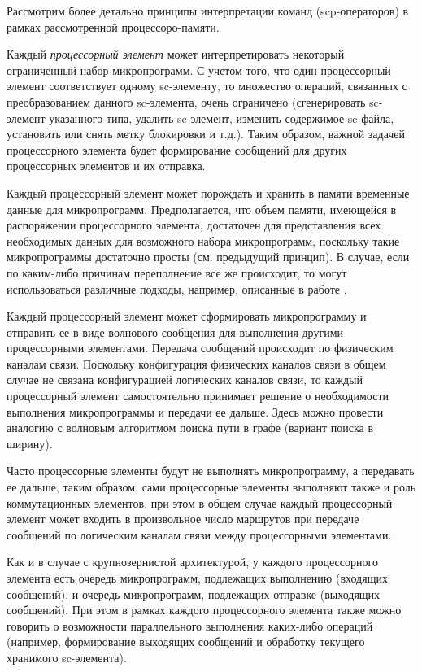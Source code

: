 Рассмотрим более детально принципы интерпретации команд (scp-операторов) в рамках рассмотренной процессоро-памяти.
\begin{textitemize}
	\item Каждый \textit{процессорный элемент} может интерпретировать некоторый ограниченный набор микропрограмм. С учетом того, что один процессорный элемент соответствует одному sc-элементу, то множество операций, связанных с преобразованием данного sc-элемента, очень ограничено (сгенерировать sc-элемент указанного типа, удалить sc-элемент, изменить содержимое sc-файла, установить или снять метку блокировки и т.д.). Таким образом, важной задачей процессорного элемента будет формирование сообщений для других процессорных элементов и их отправка.
	\item Каждый процессорный элемент может порождать и хранить в памяти временные данные для микропрограмм. Предполагается, что объем памяти, имеющейся в распоряжении процессорного элемента, достаточен для представления всех необходимых данных для возможного набора микропрограмм, поскольку такие микропрограммы достаточно просты (см. предыдущий принцип). В случае, если по каким-либо причинам переполнение все же происходит, то могут использоваться различные подходы, например, описанные в работе .
	\item Каждый процессорный элемент может сформировать микропрограмму и отправить ее в виде волнового сообщения для выполнения другими процессорными элементами. Передача сообщений происходит по физическим каналам связи. Поскольку конфигурация физических каналов связи в общем случае не связана конфигурацией логических каналов связи, то каждый процессорный элемент самостоятельно принимает решение о необходимости выполнения микропрограммы и передачи ее дальше. Здесь можно провести аналогию с волновым алгоритмом поиска пути в графе (вариант поиска в ширину).
	\item Часто процессорные элементы будут не выполнять микропрограмму, а передавать ее дальше, таким образом, сами процессорные элементы выполняют также и роль коммутационных элементов, при этом в общем случае каждый процессорный элемент может входить в произвольное число маршрутов при передаче сообщений по логическим каналам связи между процессорными элементами.
	\item Как и в случае с крупнозернистой архитектурой, у каждого процессорного элемента есть очередь микропрограмм, подлежащих выполнению (входящих сообщений), и очередь микропрограмм, подлежащих отправке (выходящих сообщений). При этом в рамках каждого процессорного элемента также можно говорить о возможности параллельного выполнения каких-либо операций (например, формирование выходящих сообщений и обработку текущего хранимого sc-элемента).
\end{textitemize}

